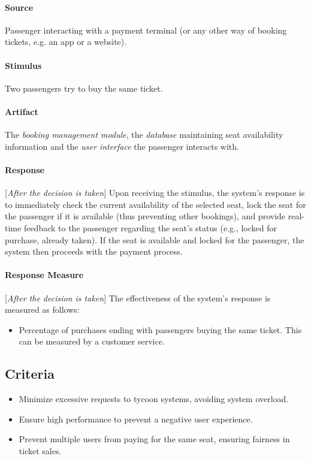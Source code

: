 \paragraph{Source} Passenger interacting with a payment terminal (or any other way of booking tickets, e.g. an app or a website).
\paragraph{Stimulus} Two passengers try to buy the same ticket.
\paragraph{Artifact} The \textit{booking management module}, the \textit{database} maintaining seat availability information and the \textit{user interface} the passenger interacts with.
\paragraph{Response}[\textit{After the decision is taken}] Upon receiving the stimulus, the system's response is to immediately check the current availability of the selected seat, lock the seat for the passenger if it is available (thus preventing other bookings), and provide real-time feedback to the passenger regarding the seat's status (e.g., locked for purchase, already taken). If the seat is available and locked for the passenger, the system then proceeds with the payment process.
\paragraph{Response Measure}[\textit{After the decision is taken}] The effectiveness of the system's response is measured as follows:
\begin{itemize}
    \item Percentage of purchases ending with passengers buying the same ticket. This can be measured by a customer service.
\end{itemize}

\subsection*{Criteria}
\begin{itemize}
    \item Minimize excessive requests to tycoon systems, avoiding system overload.
    \item Ensure high performance to prevent a negative user experience.
    \item Prevent multiple users from paying for the same seat, ensuring fairness in ticket sales.
\end{itemize}

